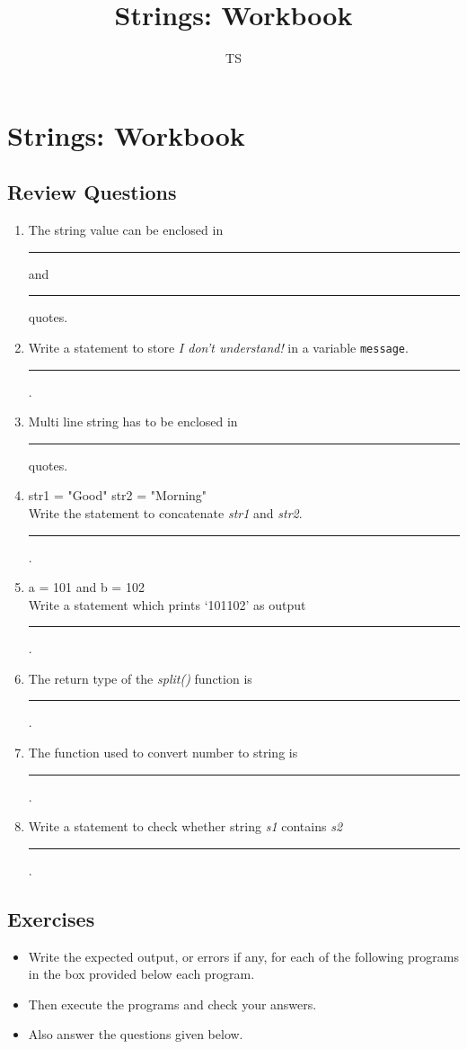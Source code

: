 \documentclass{book}
\title{Strings: Workbook}
\date{}
\author{TS}
\date{}
\begin{document}
\chapter{Strings: Workbook}

\section{Review Questions}

\begin{enumerate}
\item{The string value can be enclosed in \rule{1cm}{0.15mm} and \rule{1cm}{0.15mm} quotes.}

\item{Write a statement to store \textit{I don’t understand!} in a variable \texttt{message}. \\ 
\rule{4cm}{0.15mm}.}

\item{Multi line string has to be enclosed in \rule{1cm}{0.15mm} quotes.}

\item{str1 = "Good" str2 = "Morning"\\
Write the statement to concatenate \textit{str1} and \textit{str2}. \\
\rule{4cm}{0.15mm}.}

\item{a = 101 and b = 102 \\
Write a statement which prints ‘101102’ as output\\ \rule{4cm}{0.15mm}.}

\item{The return type of the \textit{split()} function is \rule{2cm}{0.15mm}.}

\item{The function used to convert number to string is
\rule{2cm}{0.15mm}.}

\item{Write a statement to check whether string \textit{s1} contains \textit{s2} \rule{2cm}{0.15mm}.}
\end{enumerate}

\section{Exercises}
\begin{itemize}
\item{Write the expected output, or errors if any, for each of the following programs in the box provided below each program.}
\item{Then execute the programs and check your answers.}
\item{Also answer the questions given below.}
\end{itemize}
\end{document}
